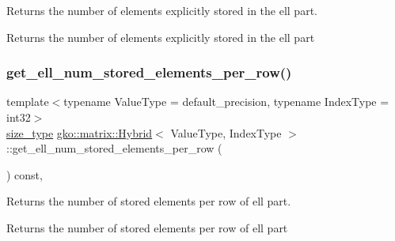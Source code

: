 Returns the number of elements explicitly stored in the ell part. 

\begin{DoxyReturn}{Returns}
the number of elements explicitly stored in the ell part 
\end{DoxyReturn}
\mbox{\label{classgko_1_1matrix_1_1Hybrid_a9ac6d0efc8627c915c73a0155e64548d}} 
\subsubsection{\texorpdfstring{get\+\_\+ell\+\_\+num\+\_\+stored\+\_\+elements\+\_\+per\+\_\+row()}{get\_ell\_num\_stored\_elements\_per\_row()}}
{\footnotesize\ttfamily template$<$typename Value\+Type = default\+\_\+precision, typename Index\+Type = int32$>$ \\
\hyperlink{namespacegko_a6e5c95df0ae4e47aab2f604a22d98ee7}{size\+\_\+type} \hyperlink{classgko_1_1matrix_1_1Hybrid}{gko\+::matrix\+::\+Hybrid}$<$ Value\+Type, Index\+Type $>$\+::get\+\_\+ell\+\_\+num\+\_\+stored\+\_\+elements\+\_\+per\+\_\+row (\begin{DoxyParamCaption}{ }\end{DoxyParamCaption}) const\hspace{0.3cm}{\ttfamily [inline]}, {\ttfamily [noexcept]}}



Returns the number of stored elements per row of ell part. 

\begin{DoxyReturn}{Returns}
the number of stored elements per row of ell part 
\end{DoxyReturn}
\mbox{\label{classgko_1_1matrix_1_1Hybrid_a2472495b537b47555a04aa6ba11d5817}} 
